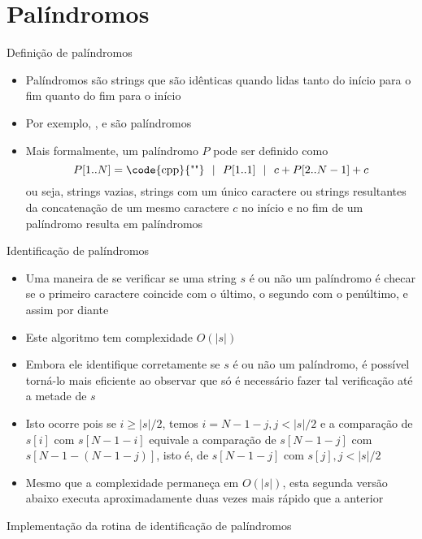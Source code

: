 \section{Palíndromos}

\begin{frame}[fragile]{Definição de palíndromos}

    \begin{itemize}
        \item Palíndromos são strings que são idênticas quando lidas tanto do início para o fim 
            quanto do fim para o início
        \pause

        \item Por exemplo, ,  e  são palíndromos
        \pause

        \item Mais formalmente, um palíndromo $P$ pode ser definido como
        \[
            P[1..N] = \mbox{\code{cpp}{""}}\ \ \vert\ \ P[1..1]\ \ \vert\ \ c + P[2..N-1] + c
        \]
        ou seja, strings vazias, strings com um único caractere ou strings resultantes da concatenação de um mesmo caractere $c$ no início e no fim de um palíndromo resulta em palíndromos

    \end{itemize}

\end{frame}

\begin{frame}[fragile]{Identificação de palíndromos}

    \begin{itemize}
        \item Uma maneira de se verificar se uma string $s$ é ou não um palíndromo é checar se o 
            primeiro caractere coincide com o último, o segundo com o penúltimo, e assim por diante
        \pause

        \item Este algoritmo tem complexidade $O(|s|)$
        \pause

        \item Embora ele identifique corretamente se $s$ é ou não um palíndromo, é possível torná-lo 
            mais eficiente ao observar que só é necessário fazer tal verificação até a metade de $s$
        \pause

        \item Isto ocorre pois se $i \geq |s|/2$, temos $i = N - 1 - j, j < |s|/2$ e a comparação 
            de $s[i]$ com $s[N - 1 - i]$ equivale a comparação de $s[N - 1 - j]$ com 
            $s[N - 1 - (N - 1 - j)]$, isto é, de $s[N - 1 - j]$ com $s[j], j < |s|/2$
        \pause

        \item Mesmo que a complexidade permaneça em $O(|s|)$, esta segunda versão abaixo executa 
            aproximadamente duas vezes mais rápido que a anterior
    \end{itemize}

\end{frame}

\begin{frame}[fragile]{Implementação da rotina de identificação de palíndromos}
\end{frame}
